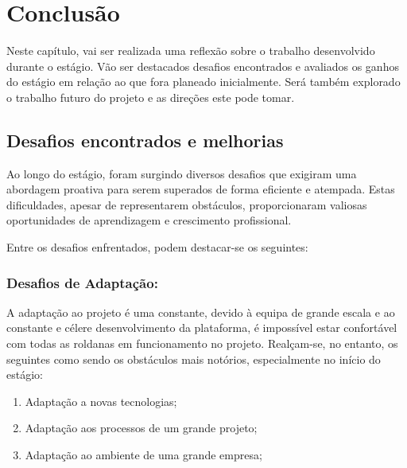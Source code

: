 \section{Conclusão}\label{sec:conclusao}

        Neste capítulo, vai ser realizada uma reflexão sobre o trabalho desenvolvido durante o estágio. Vão ser destacados desafios encontrados e avaliados os ganhos do estágio em relação ao que fora planeado inicialmente. Será também explorado o trabalho futuro do projeto e as direções este pode tomar.

    \subsection{Desafios encontrados e melhorias}\label{sub:desafios_encontrados}

        Ao longo do estágio, foram surgindo diversos desafios que exigiram uma abordagem proativa para serem superados de forma eficiente e atempada. Estas dificuldades, apesar de representarem obstáculos, proporcionaram valiosas oportunidades de aprendizagem e crescimento profissional.

        Entre os desafios enfrentados, podem destacar-se os 
        seguintes:

        \subsubsection*{Desafios de Adaptação:}
        A adaptação ao projeto é uma constante, devido à equipa de grande escala e ao constante e célere desenvolvimento da plataforma, é impossível estar confortável com todas as roldanas em funcionamento no projeto. Realçam-se, no entanto, os seguintes como sendo os obstáculos mais notórios, especialmente no início do estágio:
        \begin{enumerate}
            \item Adaptação a novas tecnologias;
            \item Adaptação aos processos de um grande projeto;
            \item Adaptação ao ambiente de uma grande empresa;
        \end{enumerate}
        
